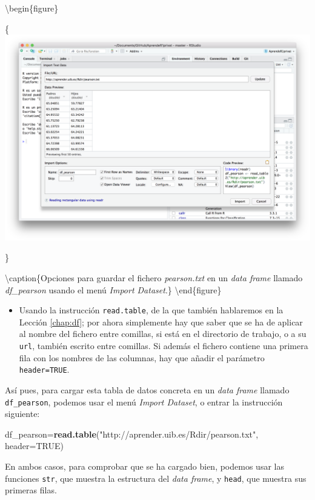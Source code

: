 \documentclass[
]{book}
\newenvironment{Shaded}{\begin{snugshade}}{\end{snugshade}}
\newcommand{\DataTypeTok}[1]{\textcolor[rgb]{0.13,0.29,0.53}{#1}}
\newcommand{\KeywordTok}[1]{\textcolor[rgb]{0.13,0.29,0.53}{\textbf{#1}}}
\newcommand{\NormalTok}[1]{#1}
\newcommand{\OtherTok}[1]{\textcolor[rgb]{0.56,0.35,0.01}{#1}}
\newcommand{\StringTok}[1]{\textcolor[rgb]{0.31,0.60,0.02}{#1}}
\providecommand{\tightlist}{%
  \setlength{\itemsep}{0pt}\setlength{\parskip}{0pt}}
\theoremstyle{definition}
\theoremstyle{definition}
\theoremstyle{definition}
\theoremstyle{remark}
\begin{document}
\textbackslash begin\{figure\}

\{\centering \includegraphics[width=0.9\linewidth]{AprendeR-Parte-I_files/figure-html/guardpearson}

\}

\textbackslash caption\{Opciones para guardar el fichero \emph{pearson.txt} en un \emph{data frame} llamado \emph{df\_pearson} usando el menú \emph{Import Dataset}.\}\label{fig:guardpearson}
\textbackslash end\{figure\}

\begin{itemize}
\tightlist
\item
  Usando la instrucción \texttt{read.table}, de la que también hablaremos en la Lección \ref{chap:df}; por ahora simplemente hay que saber que se ha de aplicar al nombre del fichero entre comillas, si está en el directorio de trabajo, o a su \texttt{url}, también escrito entre comillas. Si además el fichero contiene una primera fila con los nombres de las columnas, hay que añadir el parámetro \texttt{header=TRUE}.
\end{itemize}

Así pues, para cargar esta tabla de datos concreta en un \emph{data frame} llamado \texttt{df\_pearson}, podemos usar el menú \emph{Import Dataset}, o entrar la instrucción siguiente:

\begin{Shaded}
\begin{Highlighting}[]
\NormalTok{df\_pearson=}\KeywordTok{read.table}\NormalTok{(}\StringTok{"http://aprender.uib.es/Rdir/pearson.txt"}\NormalTok{, }\DataTypeTok{header=}\OtherTok{TRUE}\NormalTok{)}
\end{Highlighting}
\end{Shaded}

En ambos casos, para comprobar que se ha cargado bien, podemos usar las funciones \texttt{str}, que muestra la estructura del \emph{data frame}, y \texttt{head}, que muestra sus primeras filas.
\end{document}
